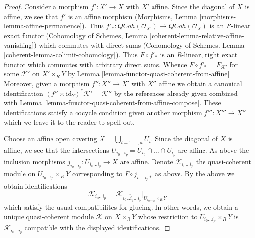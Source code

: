 \documentclass{stacks-project}
\theoremstyle{plain}
\theoremstyle{definition}
\theoremstyle{remark}
\numberwithin{equation}{subsection}
\def\QCoh{\mathit{QCoh}}
\begin{document}
\begin{proof}
Consider a morphism $f' : X' \to X$ with $X'$ affine. Since the
diagonal of $X$ is affine, we see that $f'$ is an affine morphism
(Morphisms, Lemma \ref{morphisms-lemma-affine-permanence}).
Thus $f'_* : \QCoh(\mathcal{O}_{X'}) \to \QCoh(\mathcal{O}_X)$
is an $R$-linear exact functor
(Cohomology of Schemes, Lemma \ref{coherent-lemma-relative-affine-vanishing})
which commutes with direct sums
(Cohomology of Schemes, Lemma \ref{coherent-lemma-colimit-cohomology}).
Thus $F \circ f'_*$ is an $R$-linear, right exact functor which commutes
with arbitrary direct sums. Whence
$F \circ f'_* = F_{\mathcal{K}'}$ for some $\mathcal{K}'$
on $X' \times_R Y$ by Lemma \ref{lemma-functor-quasi-coherent-from-affine}.
Moreover, given a morphism $f'' : X'' \to X'$ with $X''$ affine
we obtain a canonical identification
$(f'' \times \text{id}_Y)^*\mathcal{K}' = \mathcal{K}''$
by the references already given combined with
Lemma \ref{lemma-functor-quasi-coherent-from-affine-compose}.
These identifications satisfy a cocycle condition given
another morphism $f''' : X''' \to X''$ which we leave it to
the reader to spell out.

\medskip\noindent
Choose an affine open covering $X = \bigcup_{i = 1, \ldots, n} U_i$.
Since the diagonal of $X$ is affine, we see that the intersections
$U_{i_0 \ldots i_p} = U_{i_0} \cap \ldots \cap U_{i_p}$ are affine.
As above the inclusion morphisms
$j_{i_0 \ldots i_p} : U_{i_0 \ldots i_p} \to X$ are affine.
Denote $\mathcal{K}_{i_0 \ldots i_p}$ the quasi-coherent module
on $U_{i_0 \ldots i_p} \times_R Y$ corresponding to
$F \circ j_{i_0 \ldots i_p *}$ as above.
By the above we obtain identifications
$$
\mathcal{K}_{i_0 \ldots i_p} =
\mathcal{K}_{i_0 \ldots \hat i_j \ldots i_p}|_{U_{i_0 \ldots i_p} \times_R Y}
$$
which satisfy the usual compatibilites for glueing. In other words, we obtain
a unique quasi-coherent module $\mathcal{K}$ on $X \times_R Y$
whose restriction to $U_{i_0 \ldots i_p} \times_R Y$ is
$\mathcal{K}_{i_0 \ldots i_p}$ compatible with the displayed identifications.


\end{proof}
\end{document}
